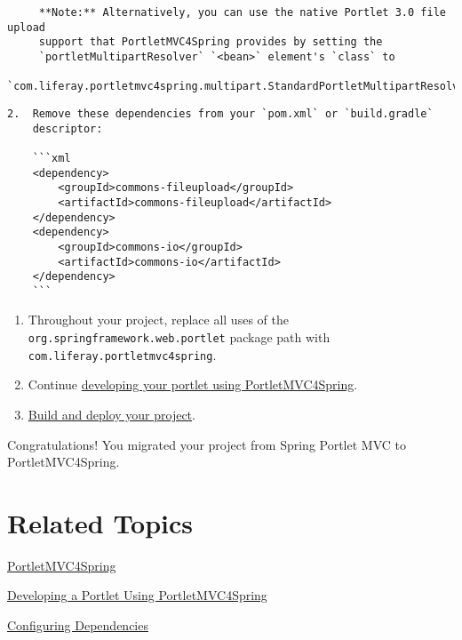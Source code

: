 \noindent\hrulefill

\begin{verbatim}
     **Note:** Alternatively, you can use the native Portlet 3.0 file upload
     support that PortletMVC4Spring provides by setting the
     `portletMultipartResolver` `<bean>` element's `class` to
     `com.liferay.portletmvc4spring.multipart.StandardPortletMultipartResolver`
\end{verbatim}

\noindent\hrulefill

\begin{verbatim}
2.  Remove these dependencies from your `pom.xml` or `build.gradle` 
    descriptor:

    ```xml
    <dependency>
        <groupId>commons-fileupload</groupId>
        <artifactId>commons-fileupload</artifactId>
    </dependency>
    <dependency>
        <groupId>commons-io</groupId>
        <artifactId>commons-io</artifactId>
    </dependency>
    ```
\end{verbatim}

\begin{enumerate}
\def\labelenumi{\arabic{enumi}.}
\setcounter{enumi}{4}
\item
  Throughout your project, replace all uses of the
  \texttt{org.springframework.web.portlet} package path with
  \texttt{com.liferay.portletmvc4spring}.
\item
  Continue
  \href{/docs/7-2/appdev/-/knowledge_base/a/developing-a-portlet-using-portletmvc4spring}{developing
  your portlet using PortletMVC4Spring}.
\item
  \href{/docs/7-2/reference/-/knowledge_base/r/deploying-a-project}{Build
  and deploy your project}.
\end{enumerate}

Congratulations! You migrated your project from Spring Portlet MVC to
PortletMVC4Spring.

\section{Related Topics}\label{related-topics-10}

\href{/docs/7-2/appdev/-/knowledge_base/a/portletmvc4spring}{PortletMVC4Spring}

\href{/docs/7-2/appdev/-/knowledge_base/a/developing-a-portlet-using-portletmvc4spring}{Developing
a Portlet Using PortletMVC4Spring}

\href{/docs/7-2/customization/-/knowledge_base/c/configuring-dependencies}{Configuring
Dependencies}

